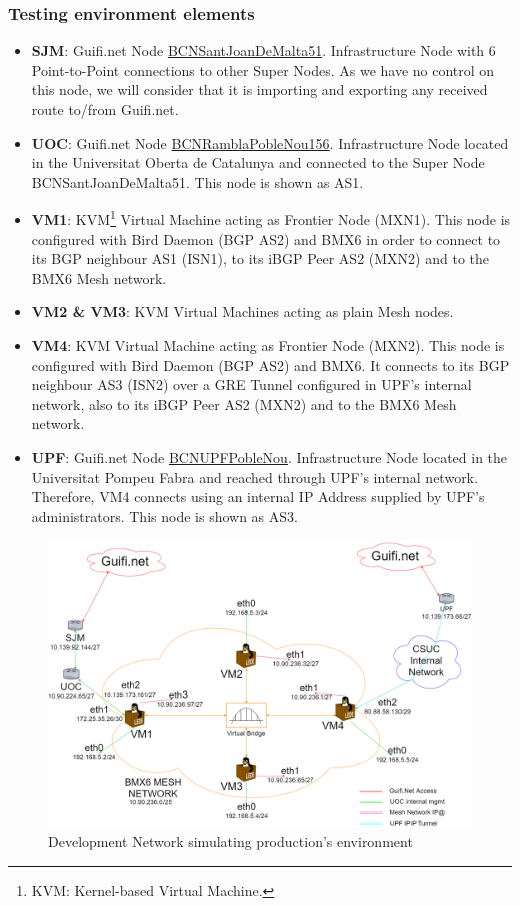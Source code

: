 \subsubsection{Testing environment elements}
\begin{itemize}
    \item \textbf{SJM}: Guifi.net Node  \href{https://guifi.net/en/node/20262/}{BCNSantJoanDeMalta51}. Infrastructure Node with 6 Point-to-Point connections to other Super Nodes. As we have no control on this node, we will consider that it is importing and exporting any received route to/from Guifi.net.
    \item \textbf{UOC}: Guifi.net Node \href{https://guifi.net/en/node/63255}{BCNRamblaPobleNou156}. Infrastructure Node located in the Universitat Oberta de Catalunya and connected to the Super Node BCNSantJoanDeMalta51. This node is shown as AS1.
    \item \textbf{VM1}: KVM\footnote{KVM: Kernel-based Virtual Machine.} Virtual Machine acting as Frontier Node (MXN1). This node is configured with Bird Daemon (BGP AS2) and BMX6 in order to connect to its BGP neighbour AS1 (ISN1), to its iBGP Peer AS2 (MXN2) and to the BMX6 Mesh network.
    \item \textbf{VM2 \& VM3}: KVM Virtual Machines acting as plain Mesh nodes.
    \item \textbf{VM4}: KVM Virtual Machine acting as Frontier Node (MXN2). This node is configured with Bird Daemon (BGP AS2) and BMX6. It connects to its BGP neighbour AS3 (ISN2) over a GRE Tunnel configured in UPF's internal network, also to its iBGP Peer AS2 (MXN2) and to the BMX6 Mesh network.
    \item \textbf{UPF}: Guifi.net Node \href{https://guifi.net/en/node/56604}{BCNUPFPobleNou}. Infrastructure Node located in the Universitat Pompeu Fabra and reached through UPF's internal network. Therefore, VM4 connects using an internal IP Address supplied by UPF's administrators. This node is shown as AS3.
\end{itemize}


\begin{landscape}
\begin{figure}[ht!]
    \centering
    \includegraphics[width=\hsize]{images/devnetfull}
    \caption{Development Network simulating production's environment}
    \label{fig:devnet}
\end{figure}
\end{landscape}
\newpage

